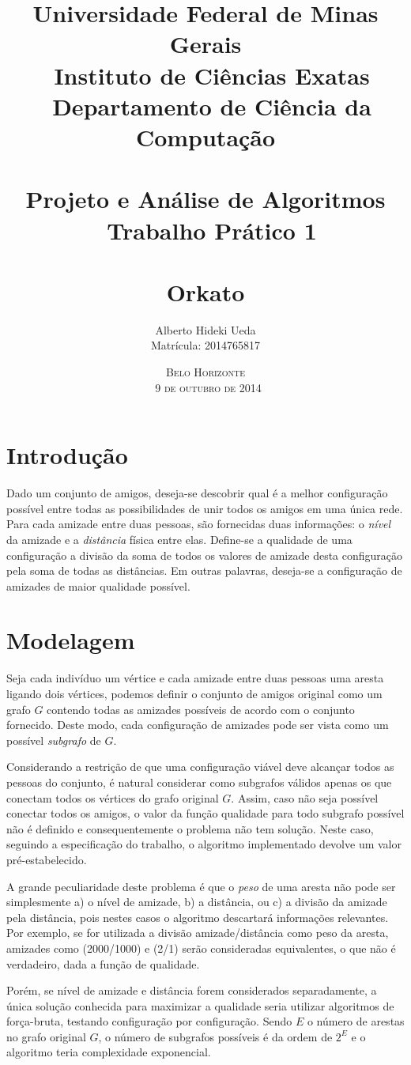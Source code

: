 \documentclass[a4paper,12pt,titlepage]{article}
\title{\large
Universidade Federal de Minas Gerais \\ \
Instituto de Ciências Exatas \\ \ 
Departamento de Ciência da Computação \\ \
\\[1cm]
Projeto e Análise de Algoritmos\\ \
Trabalho Prático 1\\ \
\\[1cm]
\textbf{\Large Orkato}
\\[1cm]
}
\author{\large Alberto Hideki Ueda \\[0.5cm] 
Matrícula: 2014765817
\\[3cm] }
\date{\textsc{Belo Horizonte\\ \
9 de outubro de 2014}}
\begin{document}
\maketitle

\pagebreak

\section{Introdução}
Dado um conjunto de amigos, deseja-se descobrir qual é a melhor configuração possível entre todas as possibilidades de unir todos os amigos em uma única rede. Para cada amizade entre duas pessoas, são fornecidas duas informações: o \textit{nível} da amizade e a \textit{distância} física entre elas. Define-se a qualidade de uma configuração a divisão da soma de todos os valores de amizade desta configuração pela soma de todas as distâncias. Em outras palavras, deseja-se a configuração de amizades de maior qualidade possível.

\section{Modelagem}
Seja cada indivíduo um vértice e cada amizade entre duas pessoas uma aresta ligando dois vértices, podemos definir o conjunto de amigos original como um grafo $G$ contendo todas as amizades possíveis de acordo com o conjunto fornecido. Deste modo, cada configuração de amizades pode ser vista como um possível \textit{subgrafo} de $G$. 

Considerando a restrição de que uma configuração viável deve alcançar todos as pessoas do conjunto, é natural considerar como subgrafos válidos apenas os que conectam todos os vértices do grafo original $G$. Assim, caso não seja possível conectar todos os amigos, o valor da função qualidade para todo subgrafo possível não é definido e consequentemente o problema não tem solução. Neste caso, seguindo a especificação do trabalho, o algoritmo implementado devolve um valor pré-estabelecido.

A grande peculiaridade deste problema é que o \textit{peso} de uma aresta não pode ser simplesmente a) o nível de amizade, b) a distância, ou c) a divisão da amizade pela distância, pois nestes casos o algoritmo descartará informações relevantes. Por exemplo, se for utilizada a divisão amizade/distância como peso da aresta, amizades como (2000/1000) e (2/1) serão consideradas equivalentes, o que não é verdadeiro, dada a função de qualidade.

Porém, se nível de amizade e distância forem considerados separadamente, a única solução conhecida para maximizar a qualidade seria utilizar algoritmos de força-bruta, testando configuração por configuração. Sendo $E$ o número de arestas no grafo original $G$, o número de subgrafos possíveis é da ordem de $2^E$ e o algoritmo teria complexidade exponencial. 
\end{document}
